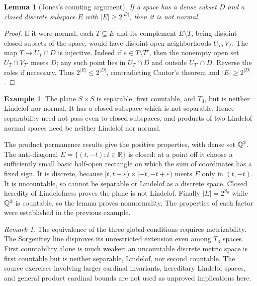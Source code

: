 \documentclass[11pt,oneside,openany]{book}
\newtheorem{lemma}[theorem]{Lemma}
\theoremstyle{definition}
\newtheorem{example}[theorem]{Example}
\theoremstyle{remark}
\newtheorem{remark}[theorem]{Remark}
\newcommand{\R}{\mathbb R}\newcommand{\C}{\mathbb C}
\newcommand{\eps}{\varepsilon}
\begin{document}
\begin{lemma}[Jones's counting argument]\label{d10:08:jones}
If a space has a dense subset $D$ and a closed discrete subspace $E$ with $|E|\geq2^{|D|}$, then it is not normal.
\end{lemma}
\begin{proof}
If it were normal, each $T\subseteq E$ and its complement $E\setminus T$, being disjoint closed subsets of the space, would have disjoint open neighborhoods $U_T,V_T$. The map $T\mapsto U_T\cap D$ is injective. Indeed if $e\in T\setminus T'$, then the nonempty open set $U_T\cap V_{T'}$ meets $D$; any such point lies in $U_T\cap D$ and outside $U_{T'}\cap D$. Reverse the roles if necessary. Thus $2^{|E|}\leq2^{|D|}$, contradicting Cantor's theorem and $|E|\geq2^{|D|}$.
\end{proof}

\begin{example}\label{d10:08:sorgenfrey-plane}
The plane $S\times S$ is separable, first countable, and $T_3$, but is neither Lindelof nor normal. It has a closed subspace which is not separable. Hence separability need not pass even to closed subspaces, and products of two Lindelof normal spaces need be neither Lindelof nor normal.

The product permanence results give the positive properties, with dense set $\mathbb Q^2$. The anti-diagonal $E=\{(t,-t):t\in\R\}$ is closed: at a point off it choose a sufficiently small basic half-open rectangle on which the sum of coordinates has a fixed sign. It is discrete, because $[t,t+\eps)\times[-t,-t+\eps)$ meets $E$ only in $(t,-t)$. It is uncountable, so cannot be separable or Lindelof as a discrete space. Closed heredity of Lindelofness proves the plane is not Lindelof. Finally $|E|=2^{\aleph_0}$ while $\mathbb Q^2$ is countable, so the lemma proves nonnormality. The properties of each factor were established in the previous example.
\end{example}

\begin{remark}\label{d10:08:implication-scope}
The equivalence of the three global conditions requires metrizability. The Sorgenfrey line disproves its unrestricted extension even among $T_3$ spaces. First countability alone is much weaker: an uncountable discrete metric space is first countable but is neither separable, Lindelof, nor second countable. The source exercises involving larger cardinal invariants, hereditary Lindelof spaces, and general product cardinal bounds are not used as unproved implications here.
\end{remark}
\end{document}
